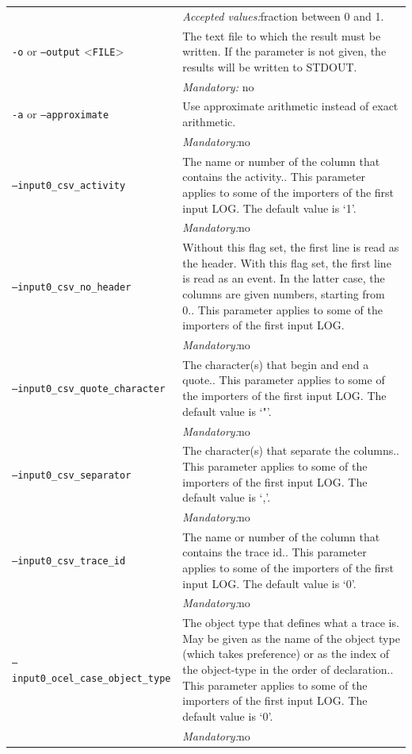 {\begin{tabularx}{\linewidth}{lX}
&\textit{Accepted values:}\quad fraction between 0 and 1.\\
\texttt{-o} or \texttt{--output} <\texttt{FILE}> &
The text file to which the result must be written. If the parameter is not given, the results will be written to STDOUT.\\
&\textit{Mandatory:} \quad no\\
\texttt{-a} or \texttt{--approximate} & Use approximate arithmetic instead of exact arithmetic.\\
&\textit{Mandatory:}\quad no\\
\texttt{--input0\_csv\_activity} & The name or number of the column that contains the activity.. This parameter applies to some of the importers of the first input LOG. The default value is `1'.\\
&\textit{Mandatory:}\quad no\\
\texttt{--input0\_csv\_no\_header} & Without this flag set, the first line is read as the header. 
    With this flag set, the first line is read as an event. In the latter case, the columns are given numbers, starting from 0.. This parameter applies to some of the importers of the first input LOG. \\
&\textit{Mandatory:}\quad no\\
\texttt{--input0\_csv\_quote\_character} & The character(s) that begin and end a quote.. This parameter applies to some of the importers of the first input LOG. The default value is `"'.\\
&\textit{Mandatory:}\quad no\\
\texttt{--input0\_csv\_separator} & The character(s) that separate the columns.. This parameter applies to some of the importers of the first input LOG. The default value is `,'.\\
&\textit{Mandatory:}\quad no\\
\texttt{--input0\_csv\_trace\_id} & The name or number of the column that contains the trace id.. This parameter applies to some of the importers of the first input LOG. The default value is `0'.\\
&\textit{Mandatory:}\quad no\\
\texttt{--input0\_ocel\_case\_object\_type} & The object type that defines what a trace is. May be given as the name of the object type (which takes preference) or as the index of the object-type in the order of declaration.. This parameter applies to some of the importers of the first input LOG. The default value is `0'.\\
&\textit{Mandatory:}\quad no\\

\end{tabularx}}
